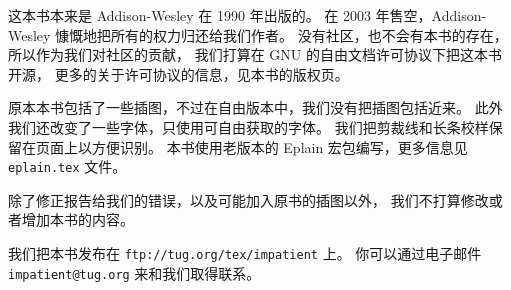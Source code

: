 %


\baselineskip

 这本书本来是 Addison-Wesley 在 1990 年出版的。
在 2003 年售空，Addison-Wesley 慷慨地把所有的权力归还给我们作者。
没有社区，也不会有本书的存在，所以作为我们对社区的贡献，
我们打算在 GNU 的自由文档许可协议下把这本书开源，
更多的关于许可协议的信息，见本书的版权页。

原本本书包括了一些插图，不过在自由版本中，我们没有把插图包括近来。
此外我们还改变了一些字体，只使用可自由获取的字体。
我们把剪裁线和长条校样保留在页面上以方便识别。
本书使用老版本的 Eplain 宏包编写，更多信息见 {\tt eplain.tex} 文件。

除了修正报告给我们的错误，以及可能加入原书的插图以外，
我们不打算修改或者增加本书的内容。

我们把本书发布在 {\tt ftp://tug.org/tex/impatient} 上。
你可以通过电子邮件 {\tt impatient@tug.org} 来和我们取得联系。

\pagebreak
\byebye

